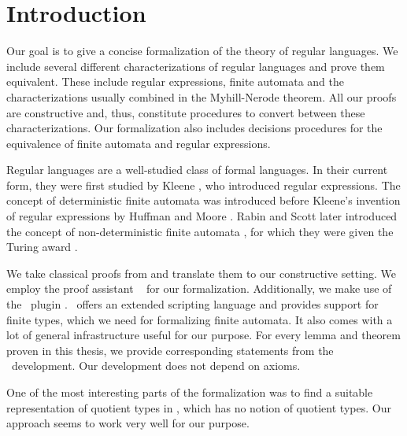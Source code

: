 \chapter{Introduction}
\label{chap:intro}

Our goal is to give a concise formalization of the theory of regular languages. 
We include several different characterizations of regular languages and prove them equivalent.
These include regular expressions, finite automata and the characterizations usually combined in the Myhill-Nerode theorem.
All our proofs are constructive and, thus, constitute procedures to convert between these characterizations.
Our formalization also includes decisions procedures for the equivalence of finite automata and regular expressions.

Regular languages are a well-studied class of formal languages. 
In their current form, they were first studied by Kleene \cite{KleeneNets}, who introduced regular expressions. 
The concept of deterministic finite automata was introduced before Kleene's invention of regular expressions by Huffman \cite{Huffman1954161} and Moore \cite{Moore56}. 
Rabin and Scott later introduced the concept of non-deterministic finite automata \cite{Rabin:1959:FAD:1661907.1661909}, for which they were given the Turing award \cite{Ashenhurst:1987:ATA:27609}.

We take classical proofs from \cite{DBLP:books/daglib/0088160} and translate them to our constructive setting. 
We employ the proof assistant \coq\ \cite{Coq:manual} for our formalization.
Additionally, we make use of the \ssreflect\ plugin \cite{gonthier:inria-00258384}. 
\ssreflect\ offers an extended scripting language and provides support for finite types, which we need for formalizing finite automata. 
It also comes with a lot of general infrastructure useful for our purpose.
For every lemma and theorem proven in this thesis, we provide corresponding statements from the \coq\ development. 
Our development does not depend on axioms.

One of the most interesting parts of the formalization was to find a suitable representation of quotient types in \coq, which has no notion of quotient types.
Our approach seems to work very well for our purpose.



